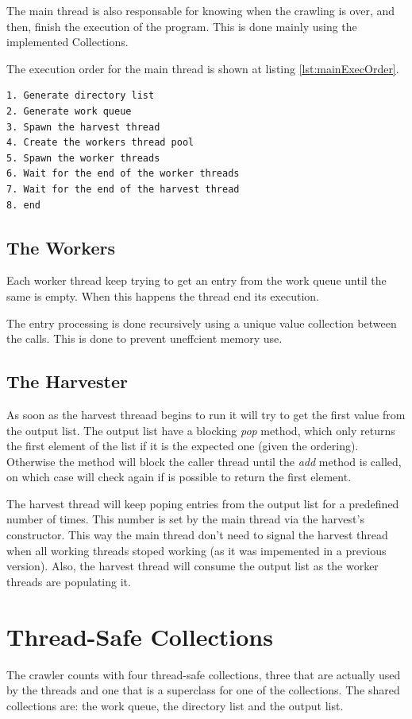 \documentclass[twocolumn,20pt]{article}
\begin{document}
The main thread is also responsable for knowing when the crawling is over, and then, finish the execution of the program. This is done mainly using the implemented Collections.

The execution order for the main thread is shown at listing \ref{lst:mainExecOrder}.

\begin{lstlisting}[caption={Main thread execution order}, label=lst:mainExecOrder]
1. Generate directory list
2. Generate work queue
3. Spawn the harvest thread
4. Create the workers thread pool
5. Spawn the worker threads
6. Wait for the end of the worker threads
7. Wait for the end of the harvest thread
8. end
\end{lstlisting}

\subsection{The Workers}
Each worker thread keep trying to get an entry from the work queue until the same is empty. When this happens the thread end its execution.

The entry processing is done recursively using a unique value collection between the calls. This is done to prevent uneffcient memory use.

\subsection{The Harvester}
As soon as the harvest threaad begins to run it will try to get the first value from the output list. The output list have a blocking \textit{pop} method, which only returns the first element of the list if it is the expected one (given the ordering). Otherwise the method will block the caller thread until the \textit{add} method is called, on which case will check again if is possible to return the first element.

The harvest thread will keep poping entries from the output list for a predefined number of times. This number is set by the main thread via the harvest's constructor. This way the main thread don't need to signal the harvest thread when all working threads stoped working (as it was impemented in a previous version). Also, the harvest thread will consume the output list as the worker threads are populating it.

\section{Thread-Safe Collections}
The crawler counts with four thread-safe collections, three that are actually used by the threads and one that is a superclass for one of the collections. The shared collections are: the work queue, the directory list and the output list.
\end{document}
